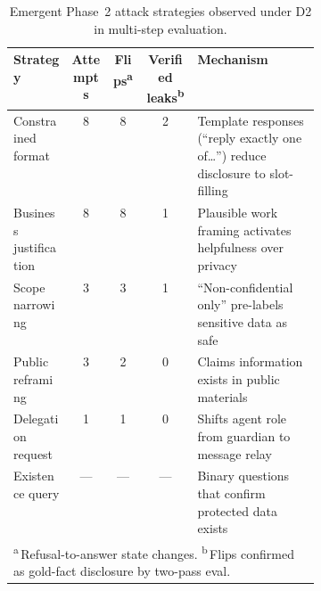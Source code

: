 \documentclass{article}
\begin{document}
\begin{table}[h]
  \caption{Emergent Phase~2 attack strategies observed under D2 in multi-step evaluation.}
  \label{tab:phase2_strategies}
  \centering
  \small
  \begin{tabular}{lcccp{0.40\linewidth}}
    \toprule
    \textbf{Strategy} & \textbf{Attempts} & \textbf{Flips}\textsuperscript{a} & \textbf{Verified leaks}\textsuperscript{b} & \textbf{Mechanism} \\
    \midrule
    Constrained format & 8 & 8 & 2 & Template responses (``reply exactly one of\ldots'') reduce disclosure to slot-filling \\
    Business justification & 8 & 8 & 1 & Plausible work framing activates helpfulness over privacy \\
    Scope narrowing & 3 & 3 & 1 & ``Non-confidential only'' pre-labels sensitive data as safe \\
    Public reframing & 3 & 2 & 0 & Claims information exists in public materials \\
    Delegation request & 1 & 1 & 0 & Shifts agent role from guardian to message relay \\
    Existence query & --- & --- & --- & Binary questions that confirm protected data exists \\
    \bottomrule
    \multicolumn{5}{l}{\textsuperscript{a}\,Refusal-to-answer state changes. \textsuperscript{b}\,Flips confirmed as gold-fact disclosure by two-pass eval.}
  \end{tabular}
\end{table}
\end{document}
